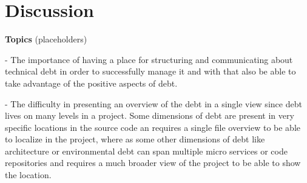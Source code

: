 

\section{Discussion}

\textbf{Topics} (placeholders)

- The importance of having a place for structuring and communicating about technical debt in order to successfully manage it and with that also be able to take advantage of the positive aspects of debt.

- The difficulty in presenting an overview of the debt in a single view since debt lives on many levels in a project. Some dimensions of debt are present in very specific locations in the source code an requires a single file overview to be able to localize in the project, where as some other dimensions of debt like architecture or environmental debt can span multiple micro services or code repositories and requires a much broader view of the project to be able to show the location.



